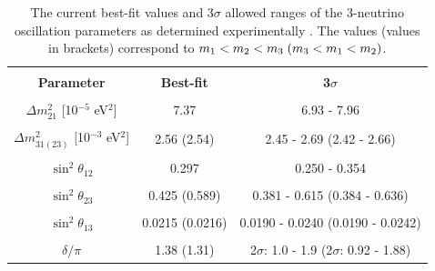 \begin{table}
	\centering
	\begin{tabular}{ccc}
		\hline
		\vspace{-0.3cm} \\ 
		\textbf{Parameter} & \textbf{Best-fit} & \textbf{3$\sigma$} \vspace{0.1cm} \\ 
		\hline 
		\vspace{-0.3cm} \\
		$\Delta m^2_{21}$ [10$^{-5}$ eV$^2$] & 7.37 & 6.93 - 7.96 \\ 
		\vspace{-0.3cm} \\
		$\Delta m^2_{31(23)}$ [10$^{-3}$ eV$^2$] & 2.56 (2.54) & 2.45 - 2.69 (2.42 - 2.66) \\ 
		\vspace{-0.3cm} \\
		$\sin^2\theta_{12}$  & 0.297 & 0.250 - 0.354 \\ 
		\vspace{-0.3cm} \\
		$\sin^2\theta_{23}$  & 0.425 (0.589) & 0.381 - 0.615 (0.384 - 0.636) \\ 
		\vspace{-0.3cm} \\
		$\sin^2\theta_{13}$  & 0.0215 (0.0216) & 0.0190 - 0.0240 (0.0190 - 0.0242) \\ 
		\vspace{-0.3cm} \\
		$\delta/\pi$ & 1.38 (1.31) & 2$\sigma$: 1.0 - 1.9 (2$\sigma$: 0.92 - 1.88) \\ 
		\hline 
	\end{tabular} 
	\caption[Neutrino Oscillation Parameters]{The current best-fit values and 3$\sigma$ allowed ranges of the 3-neutrino oscillation parameters as determined experimentally \cite{PDG}. The values (values in brackets) correspond to $m_1 < m_2 < m_3 \hspace{0.1cm} (m_3 < m_1 < m_2)$.}
	\label{tab:ParamValues}
\end{table}

